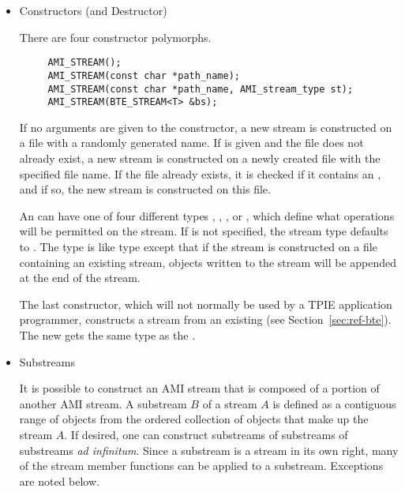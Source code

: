 \begin{itemize}
\item{Constructors (and Destructor)}

There are four constructor polymorphs.

\begin{verbatim}
     AMI_STREAM();
     AMI_STREAM(const char *path_name);
     AMI_STREAM(const char *path_name, AMI_stream_type st);
     AMI_STREAM(BTE_STREAM<T> &bs);
\end{verbatim}


If no arguments are given to the constructor, a new stream 
is constructed on a file with a randomly generated name. If
 is given and the file does not already
exist, a new stream is constructed on a newly created file
with the specified file name. If the file already exists, it
is checked if it contains an , and if so,
the new stream is constructed on this file. 

An  can have one of four different types
, ,
, or
, which define what
operations will be permitted on the stream. If  is
not specified, the stream type defaults to
. The
 type is like
 type except that if the stream is constructed on
a file containing an existing stream, objects written to the
stream will be appended at the end of the stream.

The last constructor, which will not normally be used by a
TPIE application programmer, constructs a stream from an existing
 (see Section~\ref{sec:ref-bte}). The
new  gets the same type as the .

\item{Substreams}

It is possible to construct an AMI stream that is composed
of a portion of another AMI stream. A substream $B$ of a
stream $A$ is defined as a contiguous range of objects from
the ordered collection of objects that make up the stream
$A$.  If desired, one can construct substreams of substreams
of substreams {\em ad infinitum}. Since a substream is a
stream in its own right, many of the stream member functions
can be applied to a substream. Exceptions are noted below.


\end{itemize}
